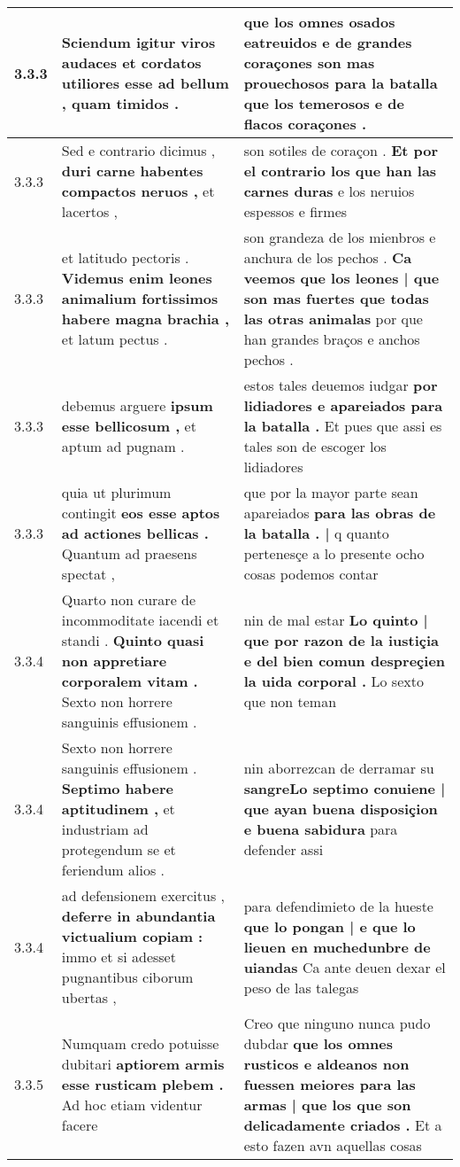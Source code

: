 \begin{tabular}{|p{1cm}|p{6.5cm}|p{6.5cm}|}
3.3.3 & Sciendum igitur viros audaces et cordatos \textbf{ utiliores esse ad bellum , } quam timidos . & que los omnes osados eatreuidos \textbf{ e de grandes coraçones son mas prouechosos para la batalla } que los temerosos e de flacos coraçones . \\\hline
3.3.3 & Sed e contrario dicimus , \textbf{ duri carne habentes compactos neruos , } et lacertos , & son sotiles de coraçon . \textbf{ Et por el contrario los que han las carnes duras } e los neruios espessos e firmes \\\hline
3.3.3 & et latitudo pectoris . \textbf{ Videmus enim leones animalium fortissimos habere magna brachia , } et latum pectus . & son grandeza de los mienbros e anchura de los pechos . \textbf{ Ca veemos que los leones | que son mas fuertes que todas las otras animalas } por que han grandes braços e anchos pechos . \\\hline
3.3.3 & debemus arguere \textbf{ ipsum esse bellicosum , } et aptum ad pugnam . & estos tales deuemos iudgar \textbf{ por lidiadores e apareiados para la batalla . } Et pues que assi es tales son de escoger los lidiadores \\\hline
3.3.3 & quia ut plurimum contingit \textbf{ eos esse aptos ad actiones bellicas . } Quantum ad praesens spectat , & que por la mayor parte sean apareiados \textbf{ para las obras de la batalla . |  } q quanto pertenesçe a lo presente ocho cosas podemos contar \\\hline
3.3.4 & Quarto non curare de incommoditate iacendi et standi . \textbf{ Quinto quasi non appretiare corporalem vitam . } Sexto non horrere sanguinis effusionem . & nin de mal estar \textbf{ Lo quinto | que por razon de la iustiçia e del bien comun despreçien la uida corporal . } Lo sexto que non teman \\\hline
3.3.4 & Sexto non horrere sanguinis effusionem . \textbf{ Septimo habere aptitudinem , } et industriam ad protegendum se et feriendum alios . & nin aborrezcan de derramar su \textbf{ sangreLo septimo conuiene | que ayan buena disposiçion e buena sabidura } para defender assi \\\hline
3.3.4 & ad defensionem exercitus , \textbf{ deferre in abundantia victualium copiam : } immo et si adesset pugnantibus ciborum ubertas , & para defendimieto de la hueste \textbf{ que lo pongan | e que lo lieuen en muchedunbre de uiandas } Ca ante deuen dexar el peso de las talegas \\\hline
3.3.5 & Numquam credo potuisse dubitari \textbf{ aptiorem armis esse rusticam plebem . } Ad hoc etiam videntur facere & Creo que ninguno nunca pudo dubdar \textbf{ que los omnes rusticos e aldeanos non fuessen meiores para las armas | que los que son delicadamente criados . } Et a esto fazen avn aquellas cosas \\\hline

\end{tabular}
